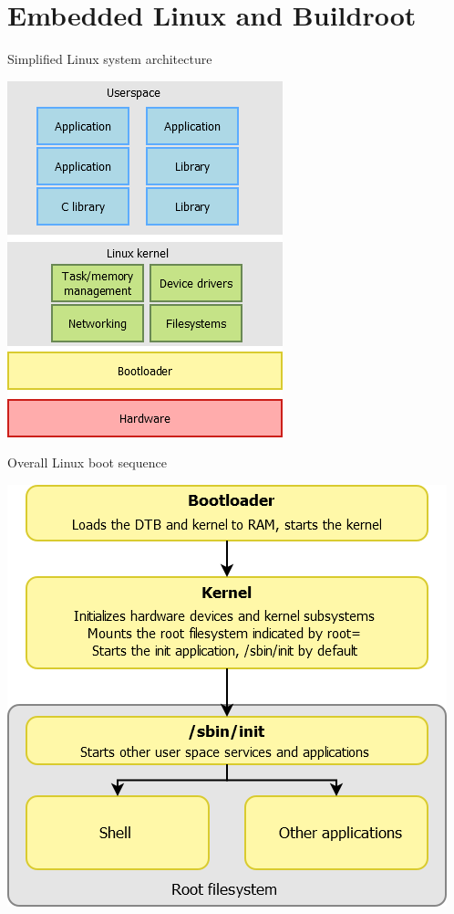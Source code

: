 \section{Embedded Linux and Buildroot}

\begin{frame}{Simplified Linux system architecture}
  \begin{center}
    \includegraphics[height=0.8\textheight]{slides/buildroot-yocto-introduction/linux-system-architecture.png}
  \end{center}
\end{frame}

\begin{frame}{Overall Linux boot sequence}
  \begin{center}
    \includegraphics[height=0.8\textheight]{slides/buildroot-yocto-introduction/overall-boot-sequence.png}
  \end{center}
\end{frame}

